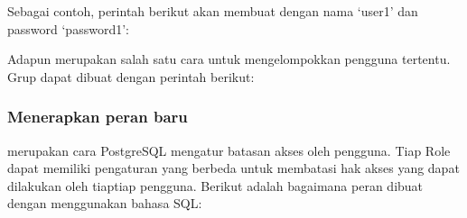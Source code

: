 \documentclass[letterpaper,10pt,english]{sphinxmanual}
\begin{document}
\begin{sphinxVerbatim}[commandchars=\\\{\}]
    \PYG{p}{[} \PYG{p}{[}  \PYG{p}{]} 
     
    \PYG{p}{[}    \PYG{p}{]}  
      
      
       \PYG{p}{[} \PYG{p}{]}
       \PYG{p}{]}
\end{sphinxVerbatim}

Sebagai contoh, perintah berikut akan membuat  dengan nama ‘user1’ dan password ‘password1’:

\begin{sphinxVerbatim}[commandchars=\\\{\}]
     
\end{sphinxVerbatim}

Adapun  merupakan salah satu cara untuk mengelompokkan pengguna tertentu. Grup dapat dibuat dengan perintah berikut:

\begin{sphinxVerbatim}[commandchars=\\\{\}]
     
\end{sphinxVerbatim}


\subsubsection{Menerapkan peran baru}
\label{\detokenize{sesi2/dbmanagement:menerapkan-peran-baru}}
 merupakan cara PostgreSQL mengatur batasan akses oleh pengguna. Tiap Role dapat memiliki pengaturan  yang berbeda untuk membatasi hak akses yang dapat dilakukan oleh tiap\sphinxhyphen{}tiap pengguna. Berikut adalah bagaimana peran dibuat dengan menggunakan bahasa SQL:

\begin{sphinxVerbatim}[commandchars=\\\{\}]
      
\end{sphinxVerbatim}
\end{document}
